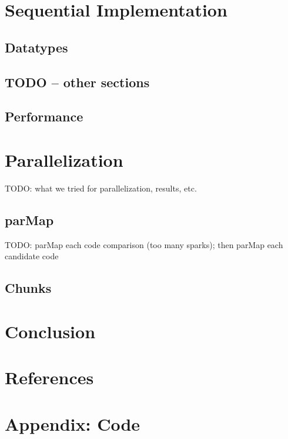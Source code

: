\documentclass{article}
\begin{document}
\section{Sequential Implementation}
\subsection{Datatypes}
\subsection{TODO -- other sections}
\subsection{Performance}

\section{Parallelization}
TODO: what we tried for parallelization, results, etc.
\subsection{parMap}
TODO: parMap each code comparison (too many sparks); then parMap each candidate code
\subsection{Chunks}

\section{Conclusion}

\section{References}

\section{Appendix: Code}
\end{document}
